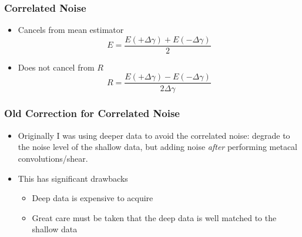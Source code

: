 \documentclass{beamer}
\begin{document}
\frame
{
    \frametitle{Correlated Noise}


    \begin{itemize}

        \item Cancels from mean estimator
            {\color{lightskyblue}
                \begin{equation}
                    E = \frac{E(+\Delta \gamma) + E(-\Delta\gamma)}{2} \nonumber
                \end{equation}
            }

        \item Does not cancel from $R$
            {\color{gold}
                \begin{equation}
                    R = \frac{E(+\Delta\gamma) - E(-\Delta\gamma)}{2 \Delta \gamma} \nonumber 
                \end{equation}
            }

    \end{itemize}

}




\frame
{
    \frametitle{Old Correction for Correlated Noise}

 
    \begin{itemize}

        \item Originally I was using deeper data to avoid the
            correlated noise: degrade to the
            noise level of the shallow data, but adding noise {\em after}
            performing metacal convolutions/shear.

        \item This has significant drawbacks
            \begin{itemize}
                \item Deep data is {\color{brightred} expensive} to acquire

                \item Great care must be taken that the deep data is well matched
                    to the shallow data
            \end{itemize}

    \end{itemize}

}
\end{document}
